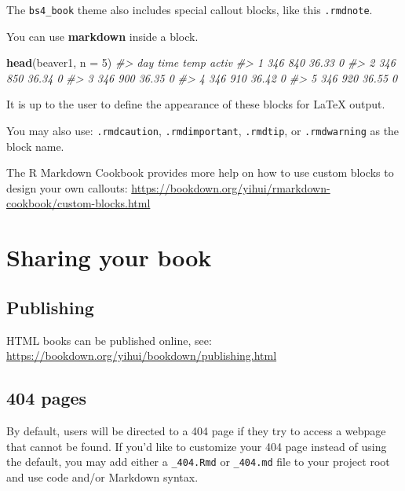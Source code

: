 \documentclass[
]{book}
\newenvironment{Shaded}{\begin{snugshade}}{\end{snugshade}}
\newcommand{\AttributeTok}[1]{\textcolor[rgb]{0.13,0.29,0.53}{#1}}
\newcommand{\CommentTok}[1]{\textcolor[rgb]{0.56,0.35,0.01}{\textit{#1}}}
\newcommand{\DecValTok}[1]{\textcolor[rgb]{0.00,0.00,0.81}{#1}}
\newcommand{\FunctionTok}[1]{\textcolor[rgb]{0.13,0.29,0.53}{\textbf{#1}}}
\newcommand{\NormalTok}[1]{#1}
\theoremstyle{definition}
\theoremstyle{definition}
\theoremstyle{definition}
\theoremstyle{definition}
\theoremstyle{remark}
\begin{document}
The \texttt{bs4\_book} theme also includes special callout blocks, like this \texttt{.rmdnote}.

You can use \textbf{markdown} inside a block.

\begin{Shaded}
\begin{Highlighting}[]
\FunctionTok{head}\NormalTok{(beaver1, }\AttributeTok{n =} \DecValTok{5}\NormalTok{)}
\CommentTok{\#\textgreater{}   day time  temp activ}
\CommentTok{\#\textgreater{} 1 346  840 36.33     0}
\CommentTok{\#\textgreater{} 2 346  850 36.34     0}
\CommentTok{\#\textgreater{} 3 346  900 36.35     0}
\CommentTok{\#\textgreater{} 4 346  910 36.42     0}
\CommentTok{\#\textgreater{} 5 346  920 36.55     0}
\end{Highlighting}
\end{Shaded}

It is up to the user to define the appearance of these blocks for LaTeX output.

You may also use: \texttt{.rmdcaution}, \texttt{.rmdimportant}, \texttt{.rmdtip}, or \texttt{.rmdwarning} as the block name.

The R Markdown Cookbook provides more help on how to use custom blocks to design your own callouts: \url{https://bookdown.org/yihui/rmarkdown-cookbook/custom-blocks.html}

\hypertarget{sharing-your-book}{%
\chapter{Sharing your book}\label{sharing-your-book}}

\hypertarget{publishing}{%
\section{Publishing}\label{publishing}}

HTML books can be published online, see: \url{https://bookdown.org/yihui/bookdown/publishing.html}

\hypertarget{pages}{%
\section{404 pages}\label{pages}}

By default, users will be directed to a 404 page if they try to access a webpage that cannot be found. If you'd like to customize your 404 page instead of using the default, you may add either a \texttt{\_404.Rmd} or \texttt{\_404.md} file to your project root and use code and/or Markdown syntax.
\end{document}
